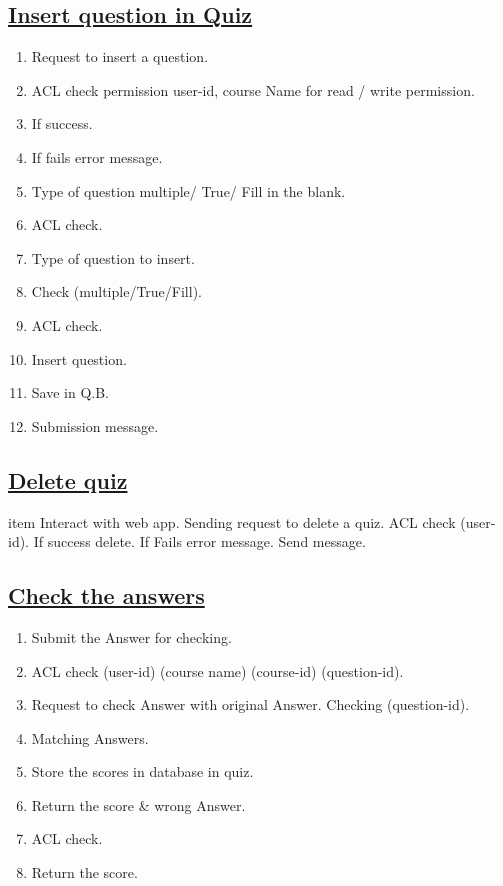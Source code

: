 \documentclass{article}
\begin{document}
\subsection*{\underline{Insert question in Quiz}}
\begin{enumerate}
\item Request to insert a question.
\item ACL check permission user-id, course Name for read / write permission.
\item If success.
\item If fails error message.
\item Type of question multiple/ True/ Fill in the blank.
\item ACL check.
\item Type of question to insert.
\item Check (multiple/True/Fill).
\item ACL check.
\item Insert question.
\item Save in Q.B.
\item Submission message.

\label{figure:InsQuest_Quiz.latex}
\end{enumerate}
\subsection*{\underline{Delete quiz}}
item Interact with web app.
Sending request to delete a quiz.
ACL check (user-id).
If success delete.
If Fails error message.
Send message.
\begin{center}

\label{figure:Delete_Quiz.latex}
\end{center}

\subsection*{\underline{Check the answers}}
\begin{enumerate}
\item Submit the Answer for checking.
\item ACL check (user-id) (course name) (course-id) (question-id).
\item Request to check Answer with original Answer. Checking (question-id).
\item Matching Answers.
\item Store the scores in database in quiz.
\item Return the score \& wrong Answer.
\item ACL check.
\item Return the score.

\begin{center}

\label{figure:CKAnswer_Quiz.latex}
\end{center}
\end{enumerate}
\end{document}
